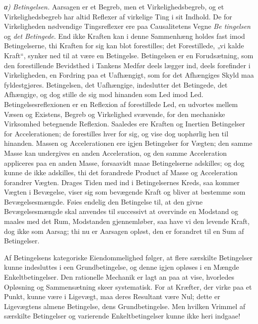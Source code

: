 \documentclass[12pt,a4paper]{book}
\newcommand{\subrunin}[1]{\emph{#1}\hspace{0.4em}}
\begin{document}
\subrunin{α) Betingelsen.} Aarsagen er et Begreb, men et
Virkelighedsbegreb, og et Virkelighedsbegreb har altid Reflexer af
virkelige Ting i sit Indhold. De for Virkeligheden nødvendige
Tingsreflexer ere paa Causalitetens Vegne \emph{Be\-%
tingelsen} og \emph{det Betingede}. End ikke Kraften kan i denne
Sammenhæng holdes fast imod Betingelserne, thi Kraften for sig kan blot
forestilles; det Forestillede, „vi kalde Kraft“, synker ned til at være
en Betingelse. Betingelsen er en Forudsætning, som den forestillende
Bevidsthed
i Tankens Medfør deels lægger ind, deels forefinder i Virkeligheden, en
Fordring paa et Uafhængigt, som for det Afhængiges Skyld maa
fyldestgjøres. Betingelsen, det Uafhængige, indeslutter det Betingede,
det Afhængige, og dog stille de sig mod hinanden som Led imod Led.
Betingelsesreflexionen er en Reflexion af forestillede Led, en udvortes
mellem Væsen og Existens, Begreb og Virkelighed svævende, for den
mechaniske Virksomhed betegnende Reflexion. Saaledes ere Kraften og
Inertien Betingelser for Accelerationen; de forestilles hver for sig, og
vise dog uophørlig hen til hinanden. Massen og Accelerationen ere igjen
Betingelser for Vægten; den samme Masse kan undergives en anden
Acceleration, og den samme Acceleration appliceres paa en anden Masse,
forsaavidt maae Betingelserne adskilles; og dog kunne de ikke adskilles,
thi det forandrede Product af Masse og Acceleration forandrer Vægten.
Drages Tiden med ind i Betingelsernes Kreds, saa kommer Vægten i
Bevægelse, viser sig som bevægende Kraft og bliver at bestemme som
Bevægelsesmængde. Føies endelig den Betingelse til, at den givne
Bevægelsesmængde skal anvendes til successivt at overvinde en Modstand og
maales med det Rum, Modstanden gjennemløber, saa have vi den levende
Kraft, dog ikke som Aarsag; thi nu er Aarsagen opløst, den er forandret
til en Sum af Betingelser.

Af Betingelsens kategoriske Eiendommelighed følger, at flere særskilte
Betingelser kunne indesluttes i een Grundbetingelse, og denne igjen
opløses i en Mængde Enkeltbetingelser. Den rationelle Mechanik er lagt an
paa at vise, hvorledes Opløsning og Sammensætning skeer systematisk. For
at Kræfter, der virke paa et Punkt, kunne være i Ligevægt, maa deres
Resultant være Nul; dette er Ligevægtens almene Betingelse, dens
Grundbetingelse. Men hvilken Vrimmel af særskilte Betingelser og
varierende Enkeltbetingelser kunne ikke heri indgaae!
\end{document}
